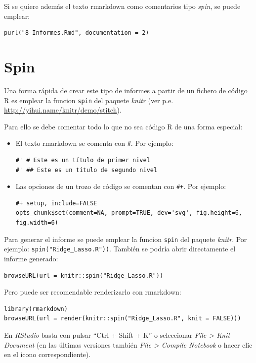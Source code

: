 \documentclass[]{book}
\begin{document}
Si se quiere además el texto rmarkdown como comentarios tipo
\emph{spin}, se puede emplear:

\begin{verbatim}
purl("8-Informes.Rmd", documentation = 2)
\end{verbatim}

\section{Spin}\label{spin}

Una forma rápida de crear este tipo de informes a partir de un fichero
de código R es emplear la funcion \texttt{spin} del paquete \emph{knitr}
(ver p.e. \url{http://yihui.name/knitr/demo/stitch}).

Para ello se debe comentar todo lo que no sea código R de una forma
especial:

\begin{itemize}
\item
  El texto rmarkdown se comenta con \texttt{\#\textquotesingle{}}. Por
  ejemplo:

\begin{verbatim}
#' # Este es un título de primer nivel
#' ## Este es un título de segundo nivel
\end{verbatim}
\item
  Las opciones de un trozo de código se comentan con \texttt{\#+}. Por
  ejemplo:

\begin{verbatim}
#+ setup, include=FALSE
opts_chunk$set(comment=NA, prompt=TRUE, dev='svg', fig.height=6, fig.width=6)
\end{verbatim}
\end{itemize}

Para generar el informe se puede emplear la funcion \texttt{spin} del
paquete \emph{knitr}. Por ejemplo: \texttt{spin("Ridge\_Lasso.R"))}.
También se podría abrir directamente el informe generado:

\begin{verbatim}
browseURL(url = knitr::spin("Ridge_Lasso.R"))
\end{verbatim}

Pero puede ser recomendable renderizarlo con rmarkdown:

\begin{verbatim}
library(rmarkdown)
browseURL(url = render(knitr::spin("Ridge_Lasso.R", knit = FALSE)))
\end{verbatim}

En \emph{RStudio} basta con pulsar ``Ctrl + Shift + K'' o seleccionar
\emph{File \textgreater{} Knit Document} (en las últimas versiones
también \emph{File \textgreater{} Compile Notebook} o hacer clic en el
icono correspondiente).
\end{document}
